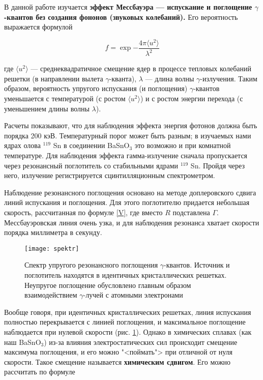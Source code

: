 \documentclass[a4paper, 12pt]{article}
\begin{document}
	В данной работе изучается \textbf{эффект Мессбауэра --- испускание и поглощение $ \gamma $-квантов без создания фононов (звуковых колебаний).} Его вероятность выражается формулой

	\begin{equation}\label{}
	f = \exp{-\dfrac{4\pi \langle u^2 \rangle}{\lambda^2}}
	\end{equation}

	где $ \langle u^2 \rangle $ --- среднеквадратичное смещение ядер в процессе тепловых колебаний решетки (в направлении вылета $ \gamma $-кванта), $ \lambda $ --- длина волны $ \gamma $-излучения. Таким образом, вероятность упругого испускания (и поглощения) $ \gamma $-квантов уменьшается с температурой (с ростом $  \langle u^2 \rangle $) и с ростом энергии перехода (с уменьшением длины волны $ \lambda $).

	Расчеты показывают, что для наблюдения эффекта энергия фотонов должна быть порядка 200 кэВ. Температурный порог может быть разным; в изучаемых нами ядрах олова $ ^{119} $ Sn в соединении BaSnO$_3$ это возможно и при комнатной температуре. Для наблюдения эффекта гамма-излучение сначала пропускается через резонансный поглотитель со стабильными ядрами $ ^{119} $ Sn. Пройдя через него, излучение регистрируется сцинтилляционным спектрометром.

	Наблюдение резонансного поглощения основано на методе доплеровского сдвига линий испускания и поглощения. Для этого поглотителю придается небольшая скорость, рассчитанная по формуле \eqref{V}, где вместо $ R $ подставлена $ \Gamma $. Мессбауэровская линия очень узка, и для наблюдения резонанса хватает скорости порядка миллиметра в секунду.

		\begin{figure}[h!]
		\centering
			\texttt{[image: spektr]}
		\caption{Спектр упругого резонансного поглощения $ \gamma $-квантов. Источник и поглотитель находятся в идентичных кристаллических решетках. Неупругое поглощение
			обусловлено главным образом взаимодействием $ \gamma $-лучей с атомными электронами}
		\label{ris 2}
	\end{figure}

	Вообще говоря, при идентичных кристаллических решетках, линия испускания полностью перекрывается с линией поглощения, и максимальное поглощение
	наблюдается при нулевой скорости (рис. \ref{ris 2}). Однако в химических сплавах (как наш BaSnO$_3$) из-за влияния электростатических сил происходит смещение максимума поглощения, и его можно "<поймать"> при отличной от нуля скорости. Такое смещение называется \textbf{химическим сдвигом}. Его можно рассчитать по формуле
\end{document}
